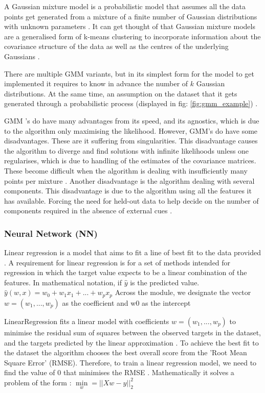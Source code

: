 	A Gaussian mixture model is a probabilistic model that assumes all the data points get generated from a mixture of a finite number of Gaussian distributions with unknown parameters \cite{geron2019hands, sklearn_gmm}. It can get thought of that Gaussian mixture models are a generalised form of k-means clustering to incorporate information about the covariance structure of the data as well as the centres of the underlying Gaussians \cite{sklearn_gmm}. 
	
	There are multiple GMM variants, but in its simplest form for the model to get implemented it requires to know in advance the number of $k$ Gaussian distributions. At the same time, an assumption on the dataset that it gets generated through a probabilistic process (displayed in fig: \ref{fig:gmm_example}) \cite{geron2019hands}. 
	
	GMM 's do have many advantages from its speed, and its agnostics, which is due to the algorithm only maximising the likelihood. However, GMM's do have some disadvantages. These are it suffering from singularities. This disadvantage causes the algorithm to diverge and find solutions with infinite likelihoods unless one regularises, which is due to handling of the estimates of the covariance matrices. These become difficult when the algorithm is dealing with insufficiently many points per mixture \cite{sklearn_gmm}. Another disadvantage is the algorithm dealing with several components. This disadvantage is due to the algorithm using all the features it has available. Forcing the need for held-out data to help decide on the number of components required in the absence of external cues \cite{sklearn_gmm}.
	
	\subsubsection{Neural Network (NN)}
	Linear regression is a model that aims to fit a line of best fit to the data provided \cite{geron2019hands, sklearn_lr}.  A requirement for linear regression is for a set of methods intended for regression in which the target value expects to be a linear combination of the features. In mathematical notation, if $\hat{y}$ is the predicted value. $\hat{y}(w,x)=w_0+w_1x_1+...+w_px_p$
	Across the module, we designate the vector $w=(w_1,...,w_p)$ as the coefficient and w0 as the intercept \cite{sklearn_lr}
	
	LinearRegression fits a linear model with coefficients $w=(w_1,...,w_p)$ to minimise the residual sum of squares between the observed targets in the dataset, and the targets predicted by the linear approximation \cite{sklearn_lr}. To achieve the best fit to the dataset the algorithm chooses the best overall score from the 'Root Mean Square Error' (RMSE). Therefore, to train a linear regression model, we need to find the value of $0$ that minimises the RMSE \cite{geron2019hands}.
	Mathematically it solves a problem of the form \cite{sklearn_lr}:
	$\min\limits_{w} = ||Xw-y||^2_2$
	

